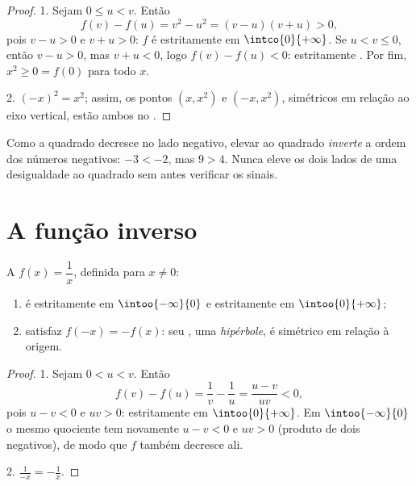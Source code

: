 \begin{proof}
1. Sejam $0 \leq u < v$. Então
\[
f(v) - f(u) = v^2 - u^2 = (v - u)(v + u) > 0,
\]
pois $v - u > 0$ e $v + u > 0$: $f$ é estritamente  em
$\intco{0}{+\infty}$. Se $u < v \leq 0$, então $v - u > 0$, mas
$v + u < 0$, logo $f(v) - f(u) < 0$: estritamente . Por fim,
$x^2 \geq 0 = f(0)$ para todo $x$.

2. $(-x)^2 = x^2$; assim, os pontos $(x, x^2)$ e $(-x, x^2)$, simétricos
em relação ao eixo vertical, estão ambos no .
\end{proof}

\begin{remark}
Como a  quadrado decresce no lado negativo, elevar ao quadrado
\emph{inverte} a ordem dos números negativos: $-3 < -2$, mas $9 > 4$.
Nunca eleve os dois lados de uma desigualdade ao quadrado sem antes
verificar os sinais.
\end{remark}

\section{A função inverso}

\begin{proposition}\label{prop:g10:reffunc:inverse}
A  $f(x) = \dfrac1x$, definida para $x \neq 0$:
\begin{enumerate}
  \item é estritamente  em $\intoo{-\infty}{0}$ e
        estritamente  em $\intoo{0}{+\infty}$;
  \item satisfaz $f(-x) = -f(x)$: seu , uma
        \emph{hipérbole}, é simétrico em relação à
        origem.
\end{enumerate}
\end{proposition}

\begin{proof}
1. Sejam $0 < u < v$. Então
\[
f(v) - f(u) = \frac1v - \frac1u = \frac{u - v}{uv} < 0,
\]
pois $u - v < 0$ e $uv > 0$: estritamente  em
$\intoo{0}{+\infty}$. Em $\intoo{-\infty}{0}$ o mesmo quociente tem
novamente $u - v < 0$ e $uv > 0$ (produto de dois negativos), de modo que
$f$ também decresce ali.

2. $\frac{1}{-x} = -\frac1x$.
\end{proof}

